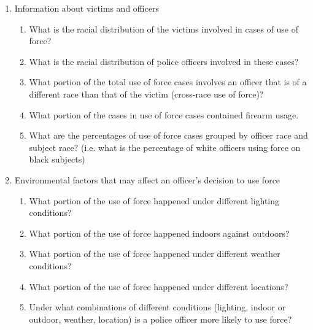 \documentclass[10pt]{article}
\begin{document}
\begin{enumerate}

\item Information about victims and officers

    \begin{enumerate}

    \item What is the racial distribution of the victims involved in cases of use of force?

    \item What is the racial distribution of police officers involved in these cases?

    \item What portion of the total use of force cases involves an officer that is of a different race than that of the victim (cross-race use of force)?

    \item What portion of the cases in use of force cases contained firearm usage.

    \item What are the percentages of use of force cases grouped by officer race and subject race? (i.e. what is the percentage of white officers using force on black subjects)

    \end{enumerate}

\item Environmental factors that may affect an officer’s decision to use force

    \begin{enumerate}

    \item What portion of the use of force happened under different lighting conditions?

    \item What portion of the use of force happened indoors against outdoors?

    \item What portion of the use of force happened under different weather conditions?

    \item What portion of the use of force happened under different locations?

    \item Under what combinations of different conditions (lighting, indoor or outdoor, weather, location) is a police officer more likely to use force?

    \end{enumerate}


\end{enumerate}
\end{document}
